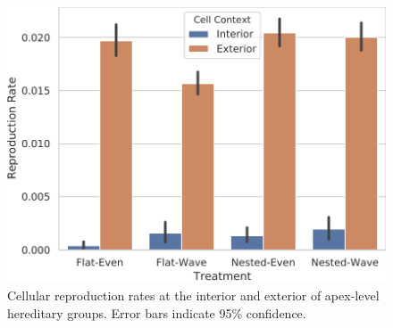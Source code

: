 \begin{figure}[!htbp]
\begin{center}

\includegraphics[width=\columnwidth]{img/reproduction/title=reproductive_labor_surrounded+_data_hathash_hash=2400d97af0b49a99+_script_fullcat_hash=d728fc498d889102+_source_hash=53a2252-clean+ext=}

\caption{
Cellular reproduction rates at the interior and exterior of apex-level hereditary groups.
Error bars indicate 95\% confidence.
}
\label{fig:reproduction_surrounded}
\end{center}
\end{figure}
